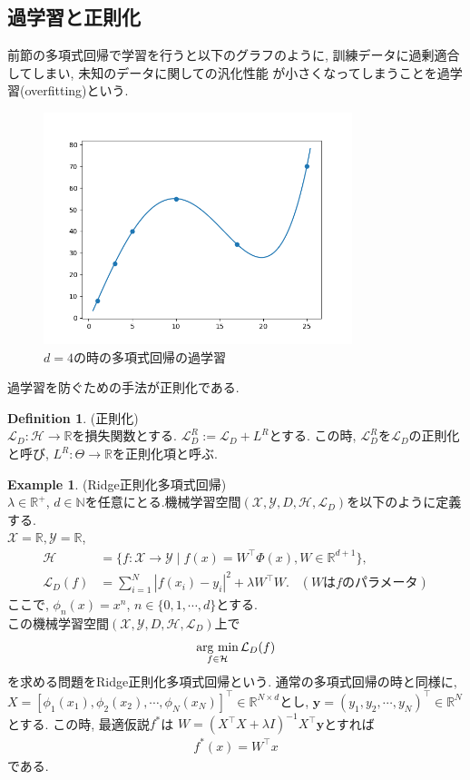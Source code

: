 \documentclass[11pt, a4paper, dvipdfmx]{jsarticle}
\theoremstyle{definition}
\newtheorem{Definition+}[Axiom+]{Definition}
\newtheorem{Example+}[Axiom+]{Example}
\newcommand{\N}{\mathbb{N}}
\newcommand{\R}{\mathbb{R}}
\newcommand{\X}{\mathcal{X}}
\newcommand{\Y}{\mathcal{Y}}
\newcommand{\Hil}{\mathcal{H}}
\newcommand{\Loss}{\mathcal{L}_{D}}
\newcommand{\MLsp}{(\X, \Y, D, \Hil, \Loss)}
\newcommand{\argmin}{\mathop{\rm arg~min}\limits}
\begin{document}
\subsection{過学習と正則化}
前節の多項式回帰で学習を行うと以下のグラフのように, 訓練データに過剰適合してしまい, 未知のデータに関しての汎化性能
が小さくなってしまうことを過学習(overfitting)という. 
\begin{figure}[H]
    \centering
    \includegraphics[width = 9.0cm]{Images/overfitting_PR.png}
    \caption{$d = 4$の時の多項式回帰の過学習}
\end{figure}
過学習を防ぐための手法が正則化である.
\begin{Definition+}(正則化)\\
    $\Loss:\Hil\to\R$を損失関数とする. $\Loss^{R} := \Loss + L^{R}$とする.
    この時, $\Loss^{R}$を$\Loss$の正則化と呼び, $L^R:\Theta\to\R$を正則化項と呼ぶ.
\end{Definition+}
\begin{Example+}(Ridge正則化多項式回帰)\\
    $\lambda\in\R^{+}$, $d\in\N$を任意にとる.機械学習空間$\MLsp$を以下のように定義する.\\
    $\X = \R, \Y = \R$, 
    \begin{align*}
        \Hil &= \{f:\X\to\Y\mid f(x) = W^{\top}\Phi(x), W\in\R^{d + 1}\},\\
        \Loss(f) &= \sum_{i = 1}^{N}|f(x_i) - y_i|^2+\lambda W^\top W.\hspace{10pt}　(W\text{は$f$のパラメータ})
    \end{align*}
    ここで, $\phi_{n}(x) = x^{n}$, $n\in\{0, 1, \cdots, d\}$とする.\\
    この機械学習空間$\MLsp$上で
    \begin{align*}
        \argmin_{f\in\Hil}\Loss(f)
    \end{align*}
    を求める問題をRidge正則化多項式回帰という. 通常の多項式回帰の時と同様に, $X = [\phi_{1}(x_1), \phi_{2}(x_{2}), \cdots, \phi_{N}(x_N)]^{\top}\in\R^{N\times d}$とし, 
    $\mathbf{y} = (y_{1}, y_{2}, \cdots, y_{N})^{\top}\in\R^{N}$とする. この時, 最適仮説$f^{*}$は
    $W = (X^\top X + \lambda I)^{-1}X^\top\mathbf{y}$とすれば
    \begin{align*}
        f^{*}(x) = W^{\top}x
    \end{align*}
    である. 
\end{Example+}
\end{document}
